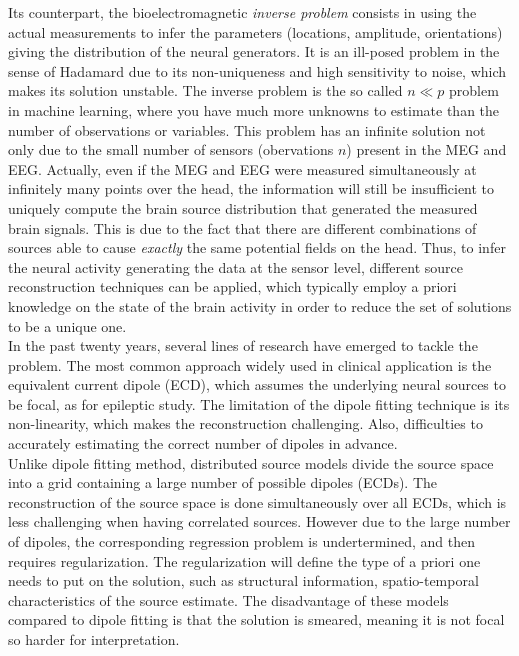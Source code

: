 Its counterpart, the bioelectromagnetic \textit{inverse problem} consists in using the actual measurements to infer the parameters (locations, amplitude, orientations) giving the distribution of the neural generators. It is an ill-posed problem in the sense of Hadamard due to its non-uniqueness and high sensitivity to noise, which makes its solution unstable. The inverse problem is the so called $n \ll p$ problem in machine learning, where you have much more unknowns to estimate than the number of observations or variables. This problem has an infinite solution not only due to the small number of sensors (obervations $n$) present in the MEG and EEG. Actually, even if the MEG and EEG were measured simultaneously at infinitely many points over the head, the information will still be insufficient to uniquely compute the brain source distribution that generated the measured brain signals. This is due to the fact that there are different combinations of sources able to cause \textit{exactly} the same potential fields on the head. Thus, to infer the neural activity generating the data at the sensor level, different source reconstruction techniques can be applied, which typically employ a priori knowledge on the state of the brain activity in order to reduce the set of solutions to be a unique one.\\

In the past twenty years, several lines of research have emerged to tackle the problem. The most common approach widely used in clinical application is the equivalent current dipole (ECD), which assumes the underlying neural sources to be focal, as for epileptic study. The limitation of the dipole fitting technique is its non-linearity, which makes the reconstruction challenging. Also, difficulties to accurately estimating the correct number of dipoles in advance. \\

Unlike dipole fitting method, distributed source models divide the source space into a grid containing a large number of possible dipoles (ECDs). The reconstruction of the source space is done simultaneously over all ECDs, which is less challenging when having correlated sources. However due to the large number of dipoles, the corresponding regression problem is undertermined, and then requires regularization. The regularization will define the type of a priori one needs to put on the solution, such as structural information, spatio-temporal characteristics of the source estimate. The disadvantage of these models compared to dipole fitting is that the solution is smeared, meaning it is not focal so harder for interpretation.\\

